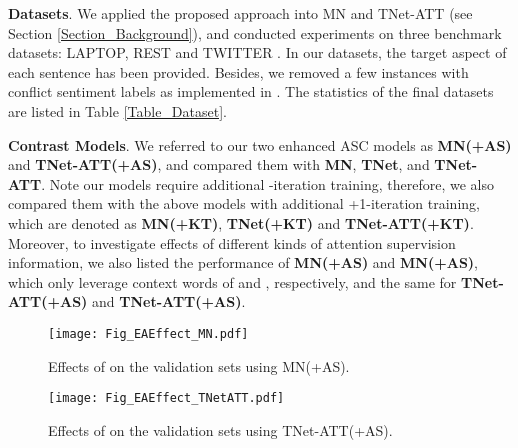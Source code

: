 \documentclass[11pt,a4paper]{article}
\begin{document}
\textbf{Datasets}.
We applied the proposed approach into
MN \cite{Tang:EMNLP2016,Wang:ACL2018} and TNet-ATT \cite{Li:ACL2018} (see Section \ref{Section_Background}),
and conducted experiments on three benchmark datasets:
LAPTOP, REST \cite{Pontiki:SemEval2014} and TWITTER \cite{Dong:ACL2014}.
In our datasets,
the target aspect of each sentence has been provided.
Besides,
we removed a few instances with conflict sentiment labels as implemented in \cite{Chen:EMNLP2017}.
The statistics of the final datasets are listed in Table \ref{Table_Dataset}.


\textbf{Contrast Models}.
We referred to our two enhanced ASC models as \textbf{MN(+AS)} and \textbf{TNet-ATT(+AS)},
and compared them with
\textbf{MN}, \textbf{TNet}, and \textbf{TNet-ATT}.
Note our models require additional -iteration training,
therefore,
we also
compared them with
the above models with additional +1-iteration training,
which are denoted as \textbf{MN(+KT)}, \textbf{TNet(+KT)} and \textbf{TNet-ATT(+KT)}.
Moreover,
to investigate effects of different kinds of attention supervision information,
we also listed the performance of \textbf{MN(+AS)} and \textbf{MN(+AS)},
which only leverage context words of  and , respectively,
and the same for \textbf{TNet-ATT(+AS)} and \textbf{TNet-ATT(+AS)}.

\begin{figure}[!t]
\centering
\texttt{[image: Fig\_EAEffect\_MN.pdf]}
\caption{
\label{Fig_EAEffect_MN}
Effects of  on the validation sets using MN(+AS).
}
\end{figure}

\begin{figure}[!t]
\centering
\texttt{[image: Fig\_EAEffect\_TNetATT.pdf]}
\caption{
\label{Fig_EAEffect_TNetATT}
Effects of  on the validation sets using TNet-ATT(+AS).
}
\end{figure}
\end{document}
